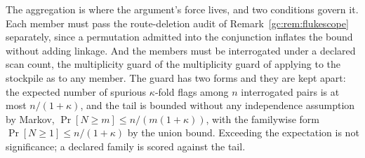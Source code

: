 \noindent The aggregation is where the argument's force lives, and two
conditions govern it. Each member must pass the
route-deletion audit of Remark~\ref{gc:rem:flukescope} separately,
since a permutation admitted into the conjunction inflates the bound
without adding linkage. And the members must be interrogated under a
declared scan count, the multiplicity guard of
the multiplicity guard of \cite{GoldenTargeted} applying to the stockpile as to any member.
The guard has two forms and they are kept apart: the expected number of
spurious $\kappa$-fold flags among $n$ interrogated pairs is at most
$n/(1+\kappa)$, and the tail is bounded without any independence
assumption by Markov, $\Pr[N\ge m]\le n/(m(1+\kappa))$, with the
familywise form $\Pr[N\ge1]\le n/(1+\kappa)$ by the union bound.
Exceeding the expectation is not significance; a declared family is
scored against the tail.

